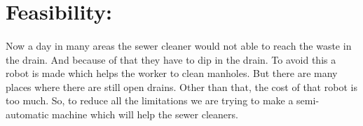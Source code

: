 \documentclass[]{article}
\begin{document}
\section{Feasibility:}
\paragraph{}
Now a day in many areas the sewer cleaner would not able to reach the waste in the drain. And because of that they have to dip in the drain. To avoid this a robot is made which helps the worker to clean manholes. But there are many places where there are still open drains. Other than that, the cost of that robot is too much. So, to reduce all the limitations we are trying to make a semi-automatic machine which will help the sewer cleaners.
\end{document}

